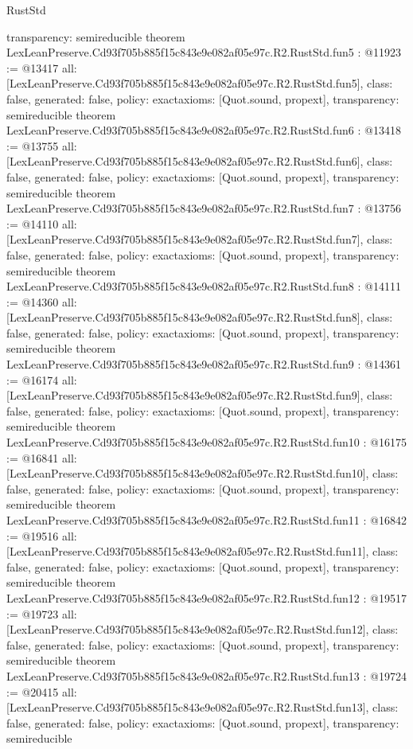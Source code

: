 \begin{lexlean}{RustStd}
\begin{coremodule}
{  transparency: semireducible
}
theorem LexLeanPreserve.Cd93f705b885f15c843e9e082af05e97c.R2.RustStd.fun5 : @11923 := @13417 {
  all: [LexLeanPreserve.Cd93f705b885f15c843e9e082af05e97c.R2.RustStd.fun5],
  class: false,
  generated: false,
  policy: exact{axioms: [Quot.sound, propext]},
  transparency: semireducible
}
theorem LexLeanPreserve.Cd93f705b885f15c843e9e082af05e97c.R2.RustStd.fun6 : @13418 := @13755 {
  all: [LexLeanPreserve.Cd93f705b885f15c843e9e082af05e97c.R2.RustStd.fun6],
  class: false,
  generated: false,
  policy: exact{axioms: [Quot.sound, propext]},
  transparency: semireducible
}
theorem LexLeanPreserve.Cd93f705b885f15c843e9e082af05e97c.R2.RustStd.fun7 : @13756 := @14110 {
  all: [LexLeanPreserve.Cd93f705b885f15c843e9e082af05e97c.R2.RustStd.fun7],
  class: false,
  generated: false,
  policy: exact{axioms: [Quot.sound, propext]},
  transparency: semireducible
}
theorem LexLeanPreserve.Cd93f705b885f15c843e9e082af05e97c.R2.RustStd.fun8 : @14111 := @14360 {
  all: [LexLeanPreserve.Cd93f705b885f15c843e9e082af05e97c.R2.RustStd.fun8],
  class: false,
  generated: false,
  policy: exact{axioms: [Quot.sound, propext]},
  transparency: semireducible
}
theorem LexLeanPreserve.Cd93f705b885f15c843e9e082af05e97c.R2.RustStd.fun9 : @14361 := @16174 {
  all: [LexLeanPreserve.Cd93f705b885f15c843e9e082af05e97c.R2.RustStd.fun9],
  class: false,
  generated: false,
  policy: exact{axioms: [Quot.sound, propext]},
  transparency: semireducible
}
theorem LexLeanPreserve.Cd93f705b885f15c843e9e082af05e97c.R2.RustStd.fun10 : @16175 := @16841 {
  all: [LexLeanPreserve.Cd93f705b885f15c843e9e082af05e97c.R2.RustStd.fun10],
  class: false,
  generated: false,
  policy: exact{axioms: [Quot.sound, propext]},
  transparency: semireducible
}
theorem LexLeanPreserve.Cd93f705b885f15c843e9e082af05e97c.R2.RustStd.fun11 : @16842 := @19516 {
  all: [LexLeanPreserve.Cd93f705b885f15c843e9e082af05e97c.R2.RustStd.fun11],
  class: false,
  generated: false,
  policy: exact{axioms: [Quot.sound, propext]},
  transparency: semireducible
}
theorem LexLeanPreserve.Cd93f705b885f15c843e9e082af05e97c.R2.RustStd.fun12 : @19517 := @19723 {
  all: [LexLeanPreserve.Cd93f705b885f15c843e9e082af05e97c.R2.RustStd.fun12],
  class: false,
  generated: false,
  policy: exact{axioms: [Quot.sound, propext]},
  transparency: semireducible
}
theorem LexLeanPreserve.Cd93f705b885f15c843e9e082af05e97c.R2.RustStd.fun13 : @19724 := @20415 {
  all: [LexLeanPreserve.Cd93f705b885f15c843e9e082af05e97c.R2.RustStd.fun13],
  class: false,
  generated: false,
  policy: exact{axioms: [Quot.sound, propext]},
  transparency: semireducible
}
\end{coremodule}
\end{lexlean}
